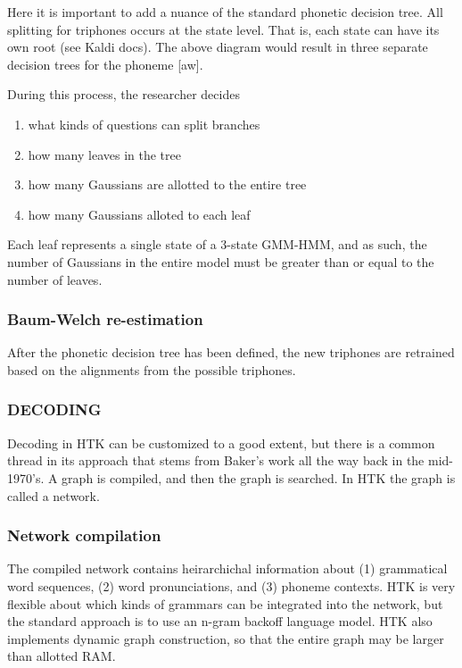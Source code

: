 \documentclass[10pt,a4paper]{article}
\begin{document}
Here it is important to add a nuance of the standard phonetic decision tree. All splitting for triphones occurs at the state level. That is, each state can have its own root (see Kaldi docs). The above diagram would result in three separate decision trees for the phoneme [aw]. 
    
During this process, the researcher decides

\begin{enumerate}
\item what kinds of questions can split branches
\item how many leaves in the tree
\item how many Gaussians are allotted to the entire tree
\item how many Gaussians alloted to each leaf
\end{enumerate}


Each leaf represents a single state of a 3-state GMM-HMM, and as such, the number of Gaussians in the entire model must be greater than or equal to the number of leaves.

    
\subsubsection*{Baum-Welch re-estimation}

After the phonetic decision tree has been defined, the new triphones are retrained based on the alignments from the possible triphones.
    

  
\subsubsection*{DECODING}

Decoding in HTK can be customized to a good extent, but there is a common thread in its approach that stems from Baker's work all the way back in the mid-1970's. A graph is compiled, and then the graph is searched. In HTK the graph is called a network.

\subsubsection*{Network compilation}

The compiled network contains heirarchichal information about (1) grammatical word sequences, (2) word pronunciations, and (3) phoneme contexts. HTK is very flexible about which kinds of grammars can be integrated into the network, but the standard approach is to use an n-gram backoff language model. HTK also implements dynamic graph construction, so that the entire graph may be larger than allotted RAM.
\end{document}
